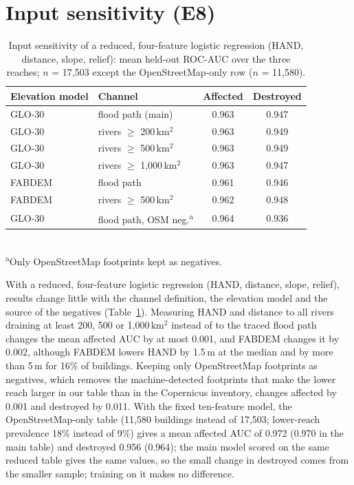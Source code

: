 \documentclass[journal,a4paper]{IEEEtran}
\begin{document}
\section{Input sensitivity (E8)}\label{app:sens}
\begin{table}[t]
\centering\footnotesize
\setlength{\tabcolsep}{3pt}
\caption{Input sensitivity of a reduced, four-feature logistic regression (HAND, distance, slope, relief): mean held-out ROC-AUC over the three reaches; $n$ = 17,503 except the OpenStreetMap-only row ($n$ = 11,580).}\label{tab:sens}
\begin{tabular}{@{}llcc@{}}
\toprule
\textbf{Elevation model} & \textbf{Channel} & \textbf{Affected} & \textbf{Destroyed}\\
\midrule
GLO-30 & flood path (main) & 0.963 & 0.947\\
GLO-30 & rivers $\geq$ 200\,km$^2$ & 0.963 & 0.949\\
GLO-30 & rivers $\geq$ 500\,km$^2$ & 0.963 & 0.949\\
GLO-30 & rivers $\geq$ 1,000\,km$^2$ & 0.963 & 0.947\\
FABDEM & flood path & 0.961 & 0.946\\
FABDEM & rivers $\geq$ 500\,km$^2$ & 0.962 & 0.948\\
GLO-30 & flood path, OSM neg.\textsuperscript{a} & 0.964 & 0.936\\
\bottomrule
\end{tabular}\\[1pt]
{\scriptsize \textsuperscript{a}Only OpenStreetMap footprints kept as negatives.}
\end{table}
With a reduced, four-feature logistic regression (HAND, distance, slope, relief), results change little with the channel definition, the elevation model and the source of the negatives (Table~\ref{tab:sens}). Measuring HAND and distance to all rivers draining at least 200, 500 or 1,000\,km$^2$ instead of to the traced flood path changes the mean affected AUC by at most 0.001, and FABDEM changes it by 0.002, although FABDEM lowers HAND by 1.5\,m at the median and by more than 5\,m for 16\% of buildings. Keeping only OpenStreetMap footprints as negatives, which removes the machine-detected footprints that make the lower reach larger in our table than in the Copernicus inventory, changes affected by 0.001 and destroyed by 0.011. With the fixed ten-feature model, the OpenStreetMap-only table (11,580 buildings instead of 17,503; lower-reach prevalence 18\% instead of 9\%) gives a mean affected AUC of 0.972 (0.970 in the main table) and destroyed 0.956 (0.964); the main model scored on the same reduced table gives the same values, so the small change in destroyed comes from the smaller sample; training on it makes no difference.
\end{document}
